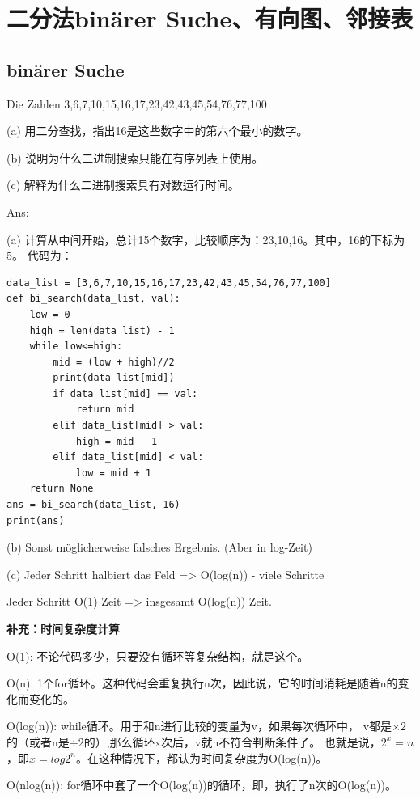 \documentclass[a4paper]{article}    %
\begin{document}
\section{二分法binärer Suche、有向图、邻接表}

\subsection{binärer Suche} 

\noindent Die Zahlen 3,6,7,10,15,16,17,23,42,43,45,54,76,77,100

(a) 用二分查找，指出16是这些数字中的第六个最小的数字。

(b)	说明为什么二进制搜索只能在有序列表上使用。

(c)	解释为什么二进制搜索具有对数运行时间。

\noindent Ans:

(a) 计算从中间开始，总计15个数字，比较顺序为：23,10,16。其中，16的下标为5。
代码为：

\begin{lstlisting}
data_list = [3,6,7,10,15,16,17,23,42,43,45,54,76,77,100]
def bi_search(data_list, val):
    low = 0
    high = len(data_list) - 1
    while low<=high:
        mid = (low + high)//2
        print(data_list[mid])
        if data_list[mid] == val:
            return mid
        elif data_list[mid] > val:
            high = mid - 1
        elif data_list[mid] < val:
            low = mid + 1
    return None
ans = bi_search(data_list, 16)
print(ans)
\end{lstlisting}

(b) Sonst möglicherweise falsches Ergebnis. (Aber in log-Zeit)

(c) Jeder Schritt halbiert das Feld => O(log(n)) - viele Schritte

Jeder Schritt O(1) Zeit => insgesamt O(log(n)) Zeit.


\noindent\textbf{补充：时间复杂度计算}

O(1): 不论代码多少，只要没有循环等复杂结构，就是这个。

O(n): 1个for循环。这种代码会重复执行n次，因此说，它的时间消耗是随着n的变化而变化的。

O(log(n)): while循环。用于和n进行比较的变量为v，如果每次循环中，
v都是$\times 2$的（或者n是$\div 2$的）,那么循环x次后，v就n不符合判断条件了。
也就是说，$2^x = n$，即$x = log2^n$。在这种情况下，都认为时间复杂度为O(log(n))。

O(nlog(n)): for循环中套了一个O(log(n))的循环，即，执行了n次的O(log(n))。
\end{document}
